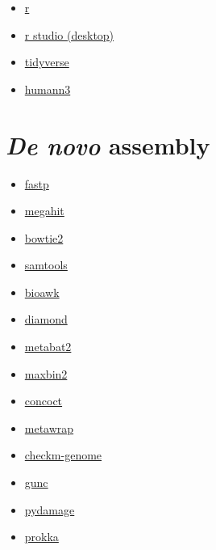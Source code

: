 \documentclass[
  letterpaper,
]{book}
\providecommand{\tightlist}{%
  \setlength{\itemsep}{0pt}\setlength{\parskip}{0pt}}\usepackage{longtable,booktabs,array}
\begin{document}
\begin{itemize}
\tightlist
\item
  \href{https://www.r-project.org/}{r}
\item
  \href{https://www.rstudio.com/products/rstudio/}{r studio (desktop)}
\item
  \href{https://www.tidyverse.org/}{tidyverse}
\item
  \href{https://huttenhower.sph.harvard.edu/humann/}{humann3}
\end{itemize}

\hypertarget{de-novo-assembly-1}{%
\section{\texorpdfstring{\emph{De novo}
assembly}{De novo assembly}}\label{de-novo-assembly-1}}

\begin{itemize}
\tightlist
\item
  \href{https://github.com/OpenGene/fastp}{fastp}
\item
  \href{https://github.com/voutcn/megahit}{megahit}
\item
  \href{http://bowtie-bio.sourceforge.net/bowtie2/index.shtml}{bowtie2}
\item
  \href{http://www.htslib.org/}{samtools}
\item
  \href{https://github.com/lh3/bioawk}{bioawk}
\item
  \href{https://github.com/bbuchfink/diamond}{diamond}
\item
  \href{https://bitbucket.org/berkeleylab/metabat/src/master/}{metabat2}
\item
  \href{https://sourceforge.net/projects/maxbin/\#:~:text=MaxBin\%20is\%20a\%20software\%20for,coverage\%20information\%20or\%20sequencing\%20reads.}{maxbin2}
\item
  \href{https://concoct.readthedocs.io/en/latest/}{concoct}
\item
  \href{https://github.com/bxlab/metaWRAP}{metawrap}
\item
  \href{https://ecogenomics.github.io/CheckM/\#:~:text=CheckM\%20provides\%20a\%20set\%20of,copy\%20within\%20a\%20phylogenetic\%20lineage.}{checkm-genome}
\item
  \href{https://grp-bork.embl-community.io/gunc/}{gunc}
\item
  \href{https://pydamage.readthedocs.io/en/0.7/}{pydamage}
\item
  \href{https://github.com/tseemann/prokka}{prokka}
\end{itemize}
\end{document}
